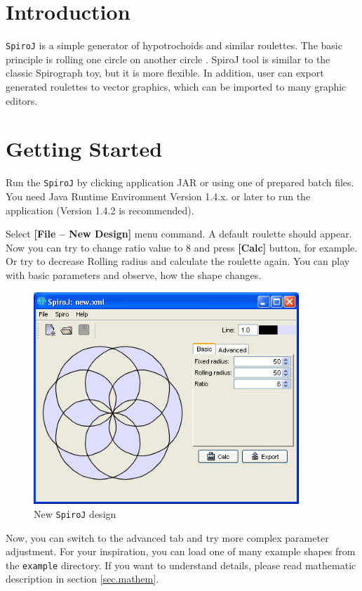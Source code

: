 \documentclass[12pt, a4paper]{article}
\newcommand{\url}[1]{\texttt{#1}}
\newcommand{\menu}[1]{\textbf{[#1]}}
\newcommand{\appName}{\texttt{SpiroJ}}
\begin{document}
\section{Introduction}

\appName{} is a simple generator of hypotrochoids and similar roulettes. The basic principle is rolling one circle on another circle \cite{wikipedia}. SpiroJ tool is similar to the classic Spirograph toy, but it is more flexible. In addition, user can export generated roulettes to vector graphics, which can be imported to many graphic editors.

\section{Getting Started}

Run the \appName{} by clicking application JAR or using one of prepared batch files. You need Java\texttrademark{} Runtime Environment \cite{java} Version 1.4.x. or later to run the application (Version 1.4.2 is recommended).

Select \menu{File -- New Design} menu command. A default roulette should appear. Now you can try to change ratio value to 8 and press \menu{Calc} button, for example. Or try to decrease Rolling radius and calculate the roulette again. You can play with basic parameters and observe, how the shape changes.

\begin{figure}[ht]\centering
  \includegraphics[width=10cm]{new_screen}
  \caption{New \appName{} design}
  \label{new_desing}
\end{figure}

Now, you can switch to the advanced tab and try more complex parameter adjustment. For your inspiration, you can load one of many example shapes from the \url{example} directory. If you want to understand details, please read mathematic description in section \ref{sec.mathem}.
\end{document}
